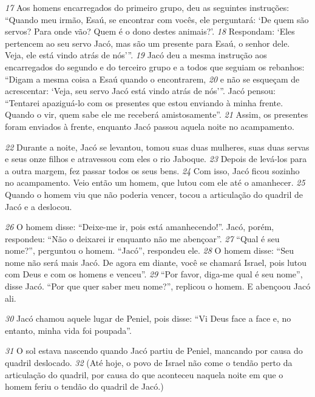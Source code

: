 \bigskip
\textit{\tiny 17}
Aos homens encarregados do primeiro grupo, deu as seguintes instruções:
“Quando meu irmão, Esaú, se encontrar com vocês, ele perguntará: ‘De quem são
servos? Para onde vão? Quem é o dono destes animais?’. 
\textit{\tiny 18}
Respondam: ‘Eles
pertencem ao seu servo Jacó, mas são um presente para Esaú, o senhor dele. Veja,
ele está vindo atrás de nós’”.
\textit{\tiny 19}
Jacó deu a mesma instrução aos encarregados do segundo e do terceiro
grupo e a todos que seguiam os rebanhos: “Digam a mesma coisa a Esaú quando o
encontrarem, 
\textit{\tiny 20}
e não se esqueçam de acrescentar: ‘Veja, seu servo Jacó está vindo
atrás de nós’”.
   Jacó pensou: “Tentarei apaziguá-lo com os presentes que estou enviando à
minha frente. Quando o vir, quem sabe ele me receberá amistosamente”. 
\textit{\tiny 21}
Assim,
os presentes foram enviados à frente, enquanto Jacó passou aquela noite no
acampamento.

\bigskip
\textit{\tiny 22}
Durante a noite, Jacó se levantou, tomou suas duas mulheres, suas duas servas e
seus onze filhos e atravessou com eles o rio Jaboque. 
\textit{\tiny 23}
Depois de levá-los para a
outra margem, fez passar todos os seus bens.
\textit{\tiny 24}
Com isso, Jacó ficou sozinho no acampamento. Veio então um homem, que
lutou com ele até o amanhecer. 
\textit{\tiny 25}
Quando o homem viu que não poderia vencer,
tocou a articulação do quadril de Jacó e a deslocou. 

\bigskip
\textit{\tiny 26}
O homem disse: “Deixe-me
ir, pois está amanhecendo!”.
    Jacó, porém, respondeu: “Não o deixarei ir enquanto não me abençoar”.
\textit{\tiny 27}
“Qual é seu nome?”, perguntou o homem.
    “Jacó”, respondeu ele.
\textit{\tiny 28}
O homem disse: “Seu nome não será mais Jacó. De agora em diante, você se
chamará Israel,
 pois lutou com Deus e com os homens e venceu”.
\textit{\tiny 29}
“Por favor, diga-me qual é seu nome”, disse Jacó.
    “Por que quer saber meu nome?”, replicou o homem. E abençoou Jacó ali.
    
\bigskip
\textit{\tiny 30}
Jacó chamou aquele lugar de Peniel,
 pois disse: “Vi Deus face a face e, no
entanto, minha vida foi poupada”. 

\bigskip
\textit{\tiny 31}
O sol estava nascendo quando Jacó partiu de
Peniel,
 mancando por causa do quadril deslocado. 
\textit{\tiny 32}
(Até hoje, o povo de Israel
não come o tendão perto da articulação do quadril, por causa do que aconteceu
naquela noite em que o homem feriu o tendão do quadril de Jacó.)

